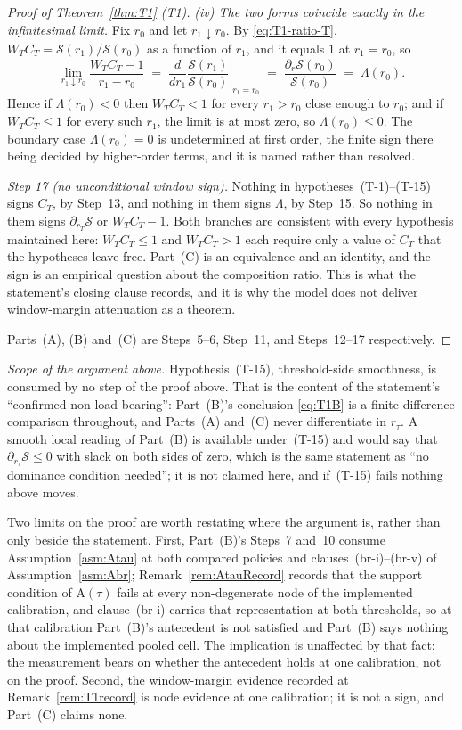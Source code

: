 \documentclass[11pt]{article}
\newcommand{\Atau}{\mathrm{A}(\tau)}
\begin{document}
\begin{proof}[Proof of Theorem~\ref{thm:T1} (T1)]
\emph{(iv) The two forms coincide exactly in the infinitesimal limit.} Fix $r_0$ and let
$r_1 \downarrow r_0$. By \eqref{eq:T1-ratio-T}, $W_T C_T = \mathcal S(r_1)/\mathcal S(r_0)$ as a
function of $r_1$, and it equals $1$ at $r_1 = r_0$, so
\[
\lim_{r_1\downarrow r_0}\frac{W_TC_T-1}{r_1-r_0}
\;=\; \frac{d}{dr_1}\left.\frac{\mathcal S(r_1)}{\mathcal S(r_0)}\right|_{r_1=r_0}
\;=\; \frac{\partial_r\mathcal S(r_0)}{\mathcal S(r_0)} \;=\; \Lambda(r_0).
\]
Hence if $\Lambda(r_0) < 0$ then $W_TC_T < 1$ for every $r_1 > r_0$ close enough to $r_0$; and if
$W_TC_T \le 1$ for every such $r_1$, the limit is at most zero, so $\Lambda(r_0) \le 0$. The
boundary case $\Lambda(r_0) = 0$ is undetermined at first order, the finite sign there being decided
by higher-order terms, and it is named rather than resolved.

\emph{Step 17 (no unconditional window sign).} Nothing in hypotheses~(T-1)--(T-15) signs $C_T$, by
Step~13, and nothing in them signs $\Lambda$, by Step~15. So nothing in them signs
$\partial_{r_T}\mathcal S$ or $W_TC_T - 1$. Both branches are consistent with every hypothesis
maintained here: $W_TC_T \le 1$ and $W_TC_T > 1$ each require only a value of $C_T$ that the
hypotheses leave free. Part~(C) is an equivalence and an identity, and the sign is an empirical
question about the composition ratio. This is what the statement's closing clause records, and it is
why the model does not deliver window-margin attenuation as a theorem.

Parts~(A), (B) and~(C) are Steps~5--6, Step~11, and Steps~12--17 respectively.
\end{proof}

\medskip
\noindent\emph{Scope of the argument above.}
Hypothesis~(T-15), threshold-side smoothness, is consumed by no step of the proof above. That is the
content of the statement's ``confirmed non-load-bearing'': Part~(B)'s conclusion \eqref{eq:T1B} is a
finite-difference comparison throughout, and Parts~(A) and~(C) never differentiate in $r_\tau$. A
smooth local reading of Part~(B) is available under~(T-15) and would say that
$\partial_{r_\tau}\mathcal S \le 0$ with slack on both sides of zero, which is the same statement as
``no dominance condition needed''; it is not claimed here, and if~(T-15) fails nothing above moves.

Two limits on the proof are worth restating where the argument is, rather than only beside the
statement. First, Part~(B)'s Steps~7 and~10 consume Assumption~\ref{asm:Atau} at both compared
policies and clauses~(br-i)--(br-v) of Assumption~\ref{asm:Abr}; Remark~\ref{rem:AtauRecord} records
that the support condition of $\Atau$ fails at every non-degenerate node of the implemented
calibration, and clause~(br-i) carries that representation at both thresholds, so at that
calibration Part~(B)'s antecedent is not satisfied and Part~(B) says nothing about the implemented
pooled cell. The implication is unaffected by that fact: the measurement bears on whether the
antecedent holds at one calibration, not on the proof. Second, the window-margin
evidence recorded at Remark~\ref{rem:T1record} is node evidence at one calibration; it is not a
sign, and Part~(C) claims none.
\end{document}
